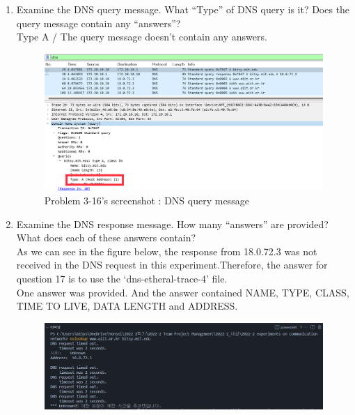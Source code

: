 \begin{enumerate}[label=\bfseries Problem \arabic*:,leftmargin=*,labelindent=1em]
\begin{figure}[!h]
        		\vspace{-10pt}
            \end{figure}
        \item Examine the DNS query message. 
        What “Type” of DNS query is it? Does the query message contain any “answers”?\\[0.2mm]
            \soln Type A / The query message doesn’t contain any answers.
            \vspace{-2mm}  
            \begin{figure}[!h]\centering
        		\includegraphics[width=.78\textwidth]{image/result_week01/Q3-g.png}
        		\caption{\footnotesize Problem 3-16's screenshot : DNS query message}
        		\vspace{-10pt}
            \end{figure}
        \item Examine the DNS response message. How many “answers” are provided?
        What does each of these answers contain?\\[0.2mm]
            \soln As we can see in the figure below, the response from 18.0.72.3 was not received in the DNS request in this experiment.Therefore,
            the answer for question 17 is to use the ‘dns-etheral-trace-4’ file.\\
            One answer was provided. And the answer contained NAME, TYPE, CLASS, TIME TO LIVE, DATA LENGTH and ADDRESS.
            \vspace{-2mm}  
            \begin{figure}[!h]\centering
        		\includegraphics[width=.78\textwidth]{image/result_week01/Q3-h-1.png}

\end{figure}
\end{enumerate}

